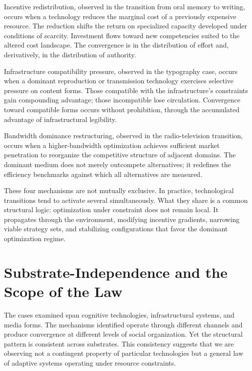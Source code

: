 \documentclass[12pt, oneside]{book}
\theoremstyle{plain}
\theoremstyle{definition}
\theoremstyle{remark}
\theoremstyle{definition}
\begin{document}
Incentive redistribution, observed in the transition from oral memory to writing,
occurs when a technology reduces the marginal cost of a previously expensive resource.
The reduction shifts the return on specialized capacity developed under conditions of
scarcity. Investment flows toward new competencies suited to the altered cost landscape.
The convergence is in the distribution of effort and, derivatively, in the distribution
of authority.

Infrastructure compatibility pressure, observed in the typography case, occurs when
a dominant reproduction or transmission technology exercises selective pressure on
content forms. Those compatible with the infrastructure's constraints gain compounding
advantage; those incompatible lose circulation. Convergence toward compatible forms
occurs without prohibition, through the accumulated advantage of infrastructural
legibility.

Bandwidth dominance restructuring, observed in the radio-television transition, occurs
when a higher-bandwidth optimization achieves sufficient market penetration to
reorganize the competitive structure of adjacent domains. The dominant medium does not
merely outcompete alternatives; it redefines the efficiency benchmarks against which
all alternatives are measured.

These four mechanisms are not mutually exclusive. In practice, technological
transitions tend to activate several simultaneously. What they share is a common
structural logic: optimization under constraint does not remain local. It propagates
through the environment, modifying incentive gradients, narrowing viable strategy
sets, and stabilizing configurations that favor the dominant optimization regime.

\section{Substrate-Independence and the Scope of the Law}

The cases examined span cognitive technologies, infrastructural systems, and media
forms. The mechanisms identified operate through different channels and produce
convergence at different levels of social organization. Yet the structural pattern
is consistent across substrates. This consistency suggests that we are observing not
a contingent property of particular technologies but a general law of adaptive systems
operating under resource constraints.
\end{document}

